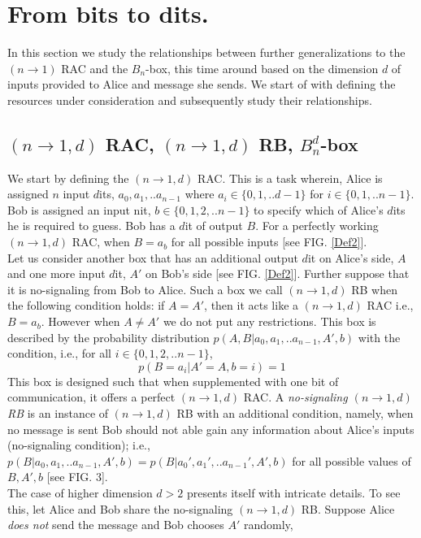 \documentclass[%
 reprint,
 amsmath,amssymb,
 aps,
]{revtex4-1}
\begin{document}
\section{From bits to dits.}
In this section we study the relationships between further generalizations to the $(n\rightarrow1)$ RAC and the $B_n$-box, this time around based on the dimension $d$ of inputs provided to Alice and message she sends. We start of with defining the resources under consideration and subsequently study their relationships.
\subsection*{$(n\rightarrow1,d)$ RAC, $(n\rightarrow1,d)$ RB, $B_n^d$-box }
\noindent We start by defining the $(n\rightarrow1,d)$ RAC. This is a task wherein,  Alice is assigned $n$ input $d$its, $a_0,a_1,..a_{n-1}$ where $a_i\in \{0,1,..d-1\}$ for $i\in \{0,1,..n-1\}$.  Bob is assigned an input nit, $b\in\{0,1,2,..n-1\}$ to specify which of Alice's $d$its he is required to guess. Bob has a $d$it of output $B$. For a perfectly working $(n\rightarrow1,d)$ RAC, when $B=a_b$ for all possible inputs [see FIG. \ref{Def2}]. \\
Let us consider another box that has an additional output $d$it on Alice's side, $A$ and one more input $d$it, $A'$ on Bob's side [see FIG. \ref{Def2}]. Further suppose that it is no-signaling from Bob to Alice. Such a box we call $(n\rightarrow1,d)$ RB when the following condition holds: if $A=A'$, then it acts like a $(n\rightarrow1,d)$ RAC i.e., $B=a_b$. However when $A\neq A'$ we do not put any restrictions.  This box is described by the probability distribution $p(A,B|a_0,a_1,..a_{n-1},A',b)$ with the condition, i.e., for all $i\in\{0,1,2,..n-1\}$,
\begin{equation}\label{de1}
p(B=a_i|A'=A,b=i)=1
\end{equation}
This box is designed such that when supplemented with one bit of communication, it offers a perfect $(n\rightarrow1,d)$ RAC. A
\textit{no-signaling $(n\rightarrow1,d)$ RB} is an instance of $(n\rightarrow1,d)$ RB with an additional condition, namely, when no message is sent Bob should not able gain any information about Alice's inputs (no-signaling condition); i.e., $p(B|a_0,a_1,..a_{n-1},A',b)=p(B|a_0',a_1',..a_{n-1}',A',b)$ for all possible values of $B,A',b$ [see FIG. 3]. \\
The case of higher dimension $d>2$ presents itself with intricate details. To see this, let Alice and Bob share the no-signaling $(n\rightarrow 1,d)$ RB. Suppose Alice \textit{does not} send the message and Bob chooses $A'$ randomly, 
\end{document}
